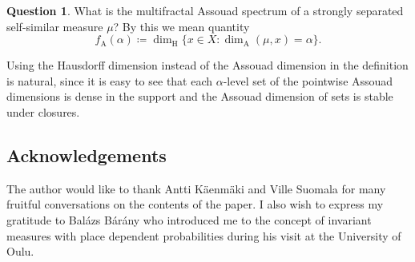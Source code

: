 \documentclass{PRM}
\newcommand{\adim}{\dim_{\mathrm{A}}}
\theoremstyle{plain}
\theoremstyle{definition}
\newtheorem{quest}{Question}
\theoremstyle{remark}
\begin{document}
\begin{quest}
What is the multifractal Assouad spectrum of a strongly separated self-similar measure $\mu$? By this we mean quantity
\begin{equation*}
     f_{\mathrm{A}}(\alpha)\coloneqq \dim_{\mathrm{H}}\{x\in X\colon \adim(\mu,x)=\alpha\}.
\end{equation*}
\end{quest}
Using the Hausdorff dimension instead of the Assouad dimension in the definition is natural, since it is easy to see that each $\alpha$-level set of the pointwise Assouad dimensions is dense in the support and the Assouad dimension of sets is stable under closures.

\subsection*{Acknowledgements}
The author would like to thank Antti Käenmäki and Ville Suomala for many fruitful conversations on the contents of the paper. I also wish to express my gratitude to Balázs Bárány who introduced me to the concept of invariant measures with place dependent probabilities during his visit at the University of Oulu.



\end{document}

